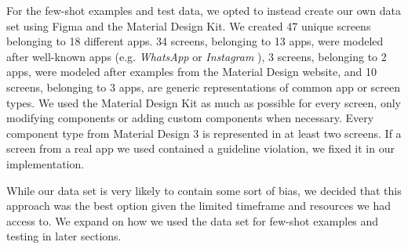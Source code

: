 \documentclass[11pt,titlepage,oneside,openany]{book}
\begin{document}
For the few-shot examples and test data, we opted to instead create our own data set using Figma and the Material Design Kit. 
We created 47 unique screens belonging to 18 different apps. 34 screens, belonging to 13 apps, were modeled after well-known apps (e.g. \emph{WhatsApp} \cite{noauthor_whatsapp_nodate} or \emph{Instagram} \cite{noauthor_instagram_nodate}), 3 screens, belonging to 2 apps, were modeled after examples from the Material Design website, and 10 screens, belonging to 3 apps, are generic representations of common app or screen types. We used the Material Design Kit as much as possible for every screen, only modifying components or adding custom components when necessary. Every component type from Material Design 3 is represented in at least two screens. If a screen from a real app we used contained a guideline violation, we fixed it in our implementation. %

While our data set is very likely to contain some sort of bias, we decided that this approach was the best option given the limited timeframe and resources we had access to. We expand on how we used the data set for few-shot examples and testing in later sections. 
\end{document}

